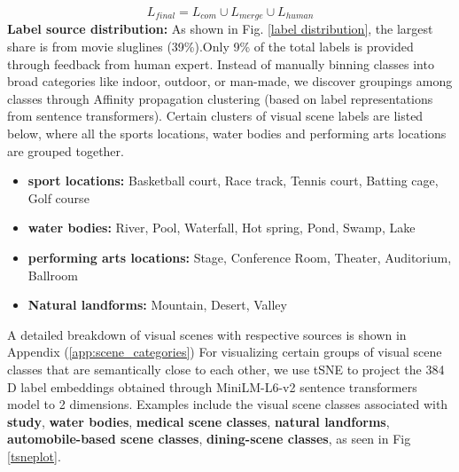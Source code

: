 \begin{equation}
     L_{final}=L_{com}\cup L_{merge} \cup L_{human}
\end{equation}
\textbf{Label source distribution:} As shown in Fig. \ref{label distribution}, the largest share is from movie sluglines (39\%).Only 9\% of the total labels is provided through feedback from human expert. Instead of manually binning classes into broad categories like indoor, outdoor, or man-made, we discover groupings among classes through Affinity propagation clustering \cite{brendanfrey}  (based on label representations from sentence transformers). Certain clusters of visual scene labels are listed below, where all the sports locations, water bodies and performing arts locations are grouped together.
\begin{itemize}
    \item \textbf{sport locations:} Basketball court, Race track, Tennis court, Batting cage, Golf course
    \item \textbf{water bodies:} River, Pool, Waterfall, Hot spring, Pond, Swamp, Lake
    \item \textbf{performing arts locations:} Stage, Conference Room, Theater, Auditorium, Ballroom
    \item \textbf{Natural landforms:} Mountain, Desert, Valley
\end{itemize}
A detailed breakdown of visual scenes with respective sources is shown in Appendix (\ref{app:scene_categories})
For visualizing certain groups of visual scene classes that are semantically close to each other, we use tSNE \cite{tSNE} to project the 384 D label embeddings obtained through MiniLM-L6-v2 sentence transformers model \cite{reimers-2019-sentence-bert} to 2 dimensions. Examples include the visual scene classes associated with \textbf{study}, \textbf{water bodies}, \textbf{medical scene classes}, \textbf{natural landforms}, \textbf{automobile-based scene classes}, \textbf{dining-scene classes}, as seen in Fig \ref{tsneplot}. 
